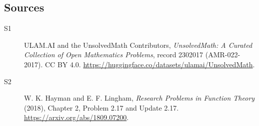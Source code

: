 \documentclass[11pt]{article}
\begin{document}
\subsection{Sources}
\begin{description}
\item[\hypertarget{source:2302017:1}{S1}] ULAM.AI and the UnsolvedMath Contributors, \emph{UnsolvedMath: A Curated Collection of Open Mathematics Problems}, record 2302017 (AMR-022-2017). CC BY 4.0. \url{https://huggingface.co/datasets/ulamai/UnsolvedMath}.
\item[\hypertarget{source:2302017:2}{S2}] W. K. Hayman and E. F. Lingham, \emph{Research Problems in Function Theory} (2018), Chapter 2, Problem 2.17 and Update 2.17. \url{https://arxiv.org/abs/1809.07200}.
\end{description}
\label{end:2302017}
\end{document}
